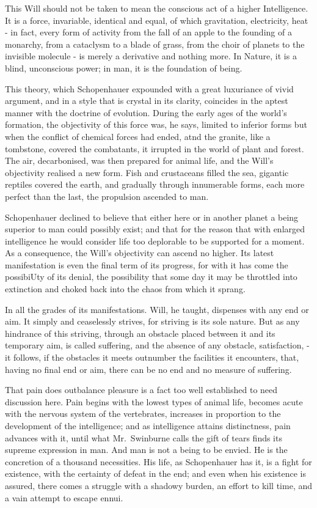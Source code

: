 \documentclass[]{book}
\begin{document}
This Will should not be taken to mean the conscious act of a higher
Intelligence. It is a force, invariable, identical and equal, of which
gravitation, electricity, heat - in fact, every form of activity from
the fall of an apple to the founding of a monarchy, from a cataclysm to
a blade of grass, from the choir of planets to the invisible molecule -
is merely a derivative and nothing more. In Nature, it is a blind,
unconscious power; in man, it is the foundation of being.

This theory, which Schopenhauer expounded with a great luxuriance of
vivid argument, and in a style that is crystal in its clarity, coincides
in the aptest manner with the doctrine of evolution. During the early
ages of the world's formation, the objectivity of this force was, he
says, limited to inferior forms but when the conflict of chemical forces
had ended, atnd the granite, like a tombstone, covered the combatants,
it irrupted in the world of plant and forest. The air, decarbonised, was
then prepared for animal life, and the Will's objectivity realised a new
form. Fish and crustaceans filled the sea, gigantic reptiles covered the
earth, and gradually through innumerable forms, each more perfect than
the last, the propulsion ascended to man.

Schopenhauer declined to believe that either here or in another planet a
being superior to man could possibly exist; and that for the reason that
with enlarged intelligence he would consider life too deplorable to be
supported for a moment. As a consequence, the Will's objectivity can
ascend no higher. Its latest manifestation is even the final term of its
progress, for with it has come the possibiUty of its denial, the
possibility that some day it may be throttled into extinction and choked
back into the chaos from which it sprang.

In all the grades of its manifestations. Will, he taught, dispenses with
any end or aim. It simply and ceaselessly strives, for striving is its
sole nature. But as any hindrance of this striving, through an obstacle
placed between it and its temporary aim, is called suffering, and the
absence of any obstacle, satisfaction, - it follows, if the obstacles it
meets outnumber the facilities it encounters, that, having no final end
or aim, there can be no end and no measure of suffering.

That pain does outbalance pleasure is a fact too well established to
need discussion here. Pain begins with the lowest types of animal life,
becomes acute with the nervous system of the vertebrates, increases in
proportion to the development of the intelligence; and as intelligence
attains distinctness, pain advances with it, until what Mr.~Swinburne
calls the gift of tears finds its supreme expression in man. And man is
not a being to be envied. He is the concretion of a thousand
necessities. His life, as Schopenhauer has it, is a fight for existence,
with the certainty of defeat in the end; and even when his existence is
assured, there comes a struggle with a shadowy burden, an effort to kill
time, and a vain attempt to escape ennui.
\end{document}
